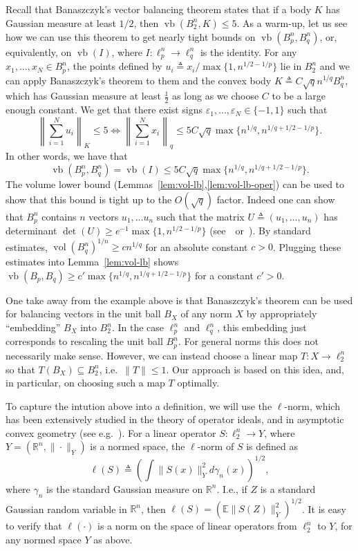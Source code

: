 \documentclass[11pt]{article}
\newcommand{\R}{{\mathbb{R}}}
\newcommand{\E}{\mathbb{E}}
\newcommand\eps{\varepsilon}
\newcommand{\eqdef}{\triangleq}
\DeclareMathOperator{\vb}{vb}
\DeclareMathOperator{\vol}{vol}
\begin{document}
Recall that Banaszczyk's vector balancing theorem states that if a
body $K$ has Gaussian measure at least $1/2$, then $\vb(B_2^n, K) \le
5$. As a warm-up, let us see how we can use this theorem to get
nearly tight bounds on $\vb(B^n_p, B^n_q)$, or, equivalently, on
$\vb(I)$, where $I:\ell_p^n \to \ell_q^n$ is the identity. For any
$x_1, \ldots, x_N \in B_p^n$, the points defined by $u_i \eqdef
{x_i}/{\max\{1, n^{1/2 -1/p}\}}$ lie in $B_2^n$ and we can apply
Banaszczyk's theorem to them and the convex body $K \eqdef C \sqrt{q}
n^{1/q} B_q^n$, which has Gaussian
measure at least $\frac12$ as long as we choose $C$ to be a large
enough constant. We get that there exist signs $\eps_1, \ldots, \eps_N
\in \{-1, 1\}$ such that 
\[
\left\|\sum_{i = 1}^N{u_i}\right\|_K \le 5
\iff
\left\|\sum_{i = 1}^N{x_i}\right\|_q \le
 5C\sqrt{q}\max\{n^{1/q}, n^{1/q + 1/2 -1/p}\}. 
\]
In other words, we have that 
\[
\vb(B_p^n, B_q^n) = \vb(I) \le
5C\sqrt{q}\max\{n^{1/q}, n^{1/q + 1/2 -1/p}\}.
\]
The volume lower bound (Lemmas~\ref{lem:vol-lb},\ref{lem:vol-lb-oper})
can be used to show that this bound is tight up to the $O(\sqrt{q})$
factor. Indeed one can show that $B_p^n$ contains $n$ vectors $u_1,
\ldots u_n$ such that the matrix $U \eqdef  (u_1, \ldots, u_n)$ has
determinant $\det(U) \ge e^{-1}  \max\{1, n^{1/2 -1/p}\}$
(see~\cite{Ball89}~or~\cite{N15}). By standard estimates,
$\vol(B_q^n)^{1/n} \ge c n^{1/q}$ for an absolute constant
$c >0$. Plugging these estimates into Lemma~\ref{lem:vol-lb} shows
$\vb(B_p, B_q) \ge c' \max\{n^{1/q}, n^{1/q + 1/2 -1/p}\}$ for a
constant $c' > 0$. 

One take away from the example above is that Banaszczyk's theorem
can be used for balancing vectors in the unit ball $B_X$ of any norm
$X$ by appropriately ``embedding'' $B_X$ into $B_2^n$. In the case
$\ell^n_p$ and $\ell^n_q$, this embedding just corresponds to
rescaling the unit ball $B_p^n$. For general norms this does not
necessarily make sense. However, we can instead choose a linear map $T:X \to
\ell_2^n$ so that $T(B_X) \subseteq B_2^n$, i.e.~$\|T\| \le 1$. Our
approach is based on this idea, and, in particular, on choosing such a
map $T$ optimally.

To capture the intution above into a definition, we will use the
$\ell$-norm, which has been extensively studied in the theory of
operator ideals, and in asymptotic convex geometry (see
e.g.~\cite{TJ-book,Pisier-book,AGM-book}). For a linear operator
$S:\ell_2^n \to Y$, where $Y = (\R^n, \|\cdot\|_Y)$ is a normed space,
the $\ell$-norm of $S$ is defined as
\[
\ell(S) \eqdef \left( \int \|S(x)\|_Y^2 d\gamma_n(x) \right)^{1/2},
\]
where $\gamma_n$ is the standard Gaussian measure on $\R^n$. I.e., if
$Z$ is a standard Gaussian random variable in $\R^n$, then $\ell(S) =
(\E \|S(Z)\|_Y^2)^{1/2}$. It is easy to verify that $\ell(\cdot)$ is a
norm on the space of linear operators from $\ell_2^n$ to $Y$, for any
normed space $Y$ as above. 
\end{document}
